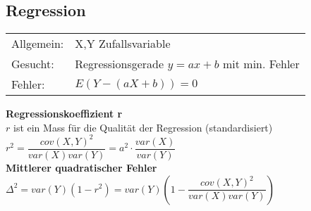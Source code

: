 \begin{minipage}[t]{9cm}
  \subsection{Regression }
  \begin{tabular}{ll}
    Allgemein: & X,Y Zufallsvariable \\
    Gesucht: & Regressionsgerade $y=ax+b$ mit min. Fehler \\
    Fehler: & $E(Y-(aX+b))=0$
  \end{tabular}
  \vspace{.1cm}
  \textbf{Regressionskoeffizient r} \\
  $r$ ist ein Mass für die Qualität der Regression (standardisiert) \\
  $r^2=\dfrac{cov(X,Y)^2}{var(X)var(Y)}=a^2\cdot\dfrac{var(X)}{var(Y)}$ \\
  \textbf{Mittlerer quadratischer Fehler} \\
  $\Delta^2 = var(Y)(1-r^2) =
  var(Y)\left(1-\dfrac{cov(X,Y)^2}{var(X)var(Y)}\right) $ \\
\end{minipage}
